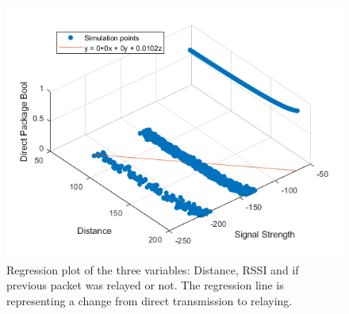 \begin{figure}[H]
	\centering
	\includegraphics[width=\linewidth]{theory/protocolDecisionExample/fig/regressionPlot.png}
	\caption{Regression plot of the three variables: Distance, RSSI and if previous packet was relayed or not. The regression line is representing a change from direct transmission to relaying.}
	\label{fig:regressionPlot}
\end{figure}